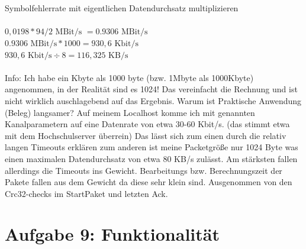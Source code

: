 \documentclass {article}[a4paper,12pt]
\begin{document}
\\
\\ Symbolfehlerrate mit eigentlichen Datendurchsatz multiplizieren\\
\\
$ 0,0198 * 94/2\text{ MBit/s } = 0.9306 \text{ MBit/s} $ \\ 
$ 0.9306 \text{ MBit/s} * 1000 = 930,6 \text{ Kbit/s} $ \\ 
$ 930,6 \text{ Kbit/s} \div 8 = 116,325 \text{ KB/s} $ \\ 
\\
\newline
Info: Ich habe ein Kbyte als 1000 byte (bzw. 1Mbyte als 1000Kbyte) angenommen, in der Realität sind es 1024!
Das vereinfacht die Rechnung und ist nicht wirklich auschlagebend auf das Ergebnis.
\newline
\newline
Warum ist Praktische Anwendung (Beleg) langsamer?
\newline
Auf meinem Localhost komme ich mit genannten Kanalparametern auf eine Datenrate von etwa 30-60 Kbit/s. (das stimmt etwa mit dem Hochschulserver überrein)
Das lässt sich zum einen durch die relativ langen Timeouts erklären zum anderen ist meine Packetgröße nur
1024 Byte was einen maximalen Datendurchsatz von etwa 80 KB/s zulässt. Am stärksten fallen allerdings die Timeouts ins Gewicht.
\newline
Bearbeitungs bzw. Berechnungszeit der Pakete fallen aus dem Gewicht da diese sehr klein sind.
Ausgenommen von den Crc32-checks im StartPaket und letzten Ack.

\newpage
\section{Aufgabe 9: Funktionalität}
\end{document}
